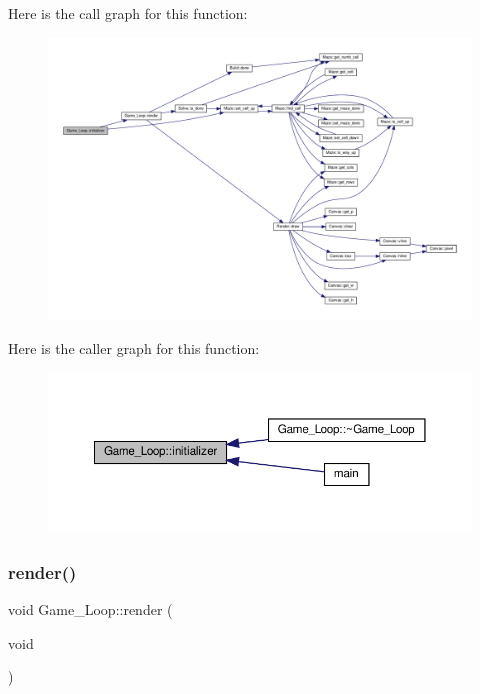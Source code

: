 Here is the call graph for this function\+:\nopagebreak
\begin{figure}[H]
\begin{center}
\leavevmode
\includegraphics[width=350pt]{classGame__Loop_a637d18a3f2c22b5ecd4c3f1905e52b88_cgraph}
\end{center}
\end{figure}
Here is the caller graph for this function\+:\nopagebreak
\begin{figure}[H]
\begin{center}
\leavevmode
\includegraphics[width=350pt]{classGame__Loop_a637d18a3f2c22b5ecd4c3f1905e52b88_icgraph}
\end{center}
\end{figure}
\mbox{\label{classGame__Loop_a5048bf3b3b18b529fe1e4a474282f274}} 
\subsubsection{\texorpdfstring{render()}{render()}}
{\footnotesize\ttfamily void Game\+\_\+\+Loop\+::render (\begin{DoxyParamCaption}\item[{void}]{ }\end{DoxyParamCaption})}



